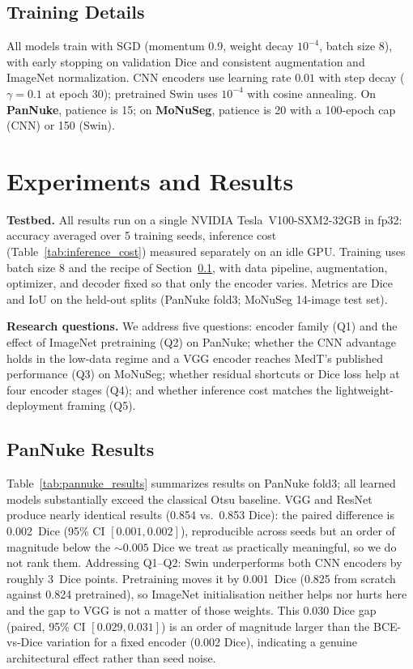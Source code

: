 \documentclass[runningheads]{llncs}
\begin{document}
\subsection{Training Details}
\label{sec:training_details}

All models train with SGD (momentum 0.9, weight decay $10^{-4}$, batch size 8), with early stopping on validation Dice and consistent augmentation and ImageNet normalization. CNN encoders use learning rate $0.01$ with step decay ($\gamma=0.1$ at epoch 30); pretrained Swin uses $10^{-4}$ with cosine annealing. On \textbf{PanNuke}, patience is 15; on \textbf{MoNuSeg}, patience is 20 with a 100-epoch cap (CNN) or 150 (Swin).

\section{Experiments and Results}
\label{sec:experiments}

\noindent\textbf{Testbed.} All results run on a single NVIDIA Tesla~V100-SXM2-32GB in
fp32: accuracy averaged over 5 training seeds, inference cost
(Table~\ref{tab:inference_cost}) measured separately on an idle GPU. Training uses batch
size 8 and the recipe of Section~\ref{sec:training_details}, with data pipeline,
augmentation, optimizer, and decoder fixed so that only the encoder varies. Metrics are Dice and IoU on the held-out splits (PanNuke fold3; MoNuSeg 14-image test set).

\noindent\textbf{Research questions.} We address five questions: encoder family (Q1) and the effect of ImageNet pretraining (Q2) on PanNuke; whether the CNN advantage holds in the low-data regime and a VGG encoder reaches MedT's published performance (Q3) on MoNuSeg; whether residual shortcuts or Dice loss help at four encoder stages (Q4); and whether inference cost matches the lightweight-deployment framing (Q5).

\subsection{PanNuke Results}
\label{sec:pannuke_results}

Table~\ref{tab:pannuke_results} summarizes results on PanNuke fold3; all learned models substantially exceed the classical Otsu baseline. VGG and ResNet produce nearly identical results (0.854 vs.\ 0.853 Dice): the
paired difference is 0.002~Dice (95\% CI $[0.001, 0.002]$), reproducible across
seeds but an order of magnitude below the ${\sim}0.005$ Dice we treat as
practically meaningful, so we do not rank them.
Addressing Q1--Q2: Swin underperforms both CNN encoders by roughly 3~Dice points.
Pretraining moves it by 0.001~Dice (0.825 from scratch against 0.824
pretrained), so ImageNet initialisation neither helps nor hurts here and the gap
to VGG is not a matter of those weights. This 0.030 Dice gap (paired, 95\% CI $[0.029, 0.031]$) is an order of magnitude larger than the BCE-vs-Dice variation
for a fixed encoder (0.002 Dice), indicating a genuine architectural effect
rather than seed noise.
\end{document}
